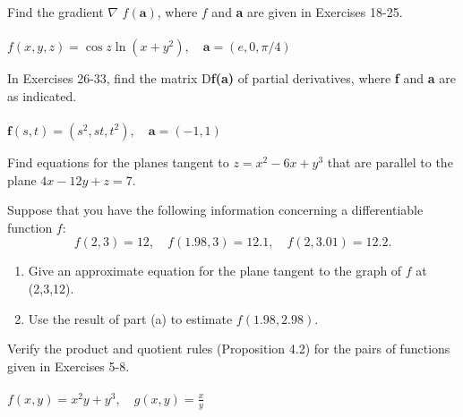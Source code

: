 \documentclass[12pt,letterpaper]{hmcpset}
\begin{document}

\begin{problem}[2.3.24]
    Find the gradient $\nabla$ $f(\textbf{a})$, where $f$ and
    \textbf{a} are given in Exercises 18-25.\\\\
    $f(x,y,z)=\cos z\ln(x+y^2),\quad \textbf{a}=(e,0,\pi/4)$
\end{problem}
\begin{solution}
    \vfill
\end{solution}
\newpage

\begin{problem}[2.3.33]
    In Exercises 26-33, find the matrix D\textbf{f(a)} of partial
    derivatives, where \textbf{f} and \textbf{a} are as indicated.\\\\
    $\textbf{f}(s,t)=(s^2,st,t^2),\quad \textbf{a}=(-1,1)$
\end{problem}
\begin{solution}
    \vfill
\end{solution}
\newpage

\begin{problem}[2.3.40]
    Find equations for the planes tangent to $z=x^2-6x+y^3$ that are parallel to
    the plane $4x-12y+z=7$.
\end{problem}
\begin{solution}
    \vfill
\end{solution}
\newpage

\begin{problem}[2.3.42]
    Suppose that you have the following information concerning a
    differentiable function $f$:
    $$f(2,3)=12,\quad f(1.98,3)=12.1,\quad f(2,3.01)=12.2.$$
    \begin{enumerate}
        \item Give an approximate equation for the plane tangent to the graph of
            $f$ at (2,3,12).
        \item Use the result of part (a) to estimate $f(1.98, 2.98)$.
    \end{enumerate}
\end{problem}
\begin{solution}
    \vfill
\end{solution}
\newpage

\begin{problem}[2.4.5]
    Verify the product and quotient rules (Proposition 4.2) for the
    pairs of functions given in Exercises 5-8.\\\\
    $\displaystyle f(x,y)=x^2y+y^3,\quad g(x,y)=\frac{x}{y}$
\end{problem}
\begin{solution}
    \vfill
\end{solution}
\newpage
\end{document}
